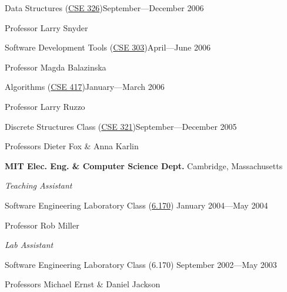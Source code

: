 \documentclass[letter]{article}
\begin{document}
\vspace{0.5\baselineskip}
\par
Data Structures (\href{http://www.cs.washington.edu/education/courses/326/06au/}{CSE 326})\hfill September---December 2006
\par
Professor Larry Snyder

\vspace{0.5\baselineskip}
\par
Software Development Tools (\href{http://www.cs.washington.edu/education/courses/303/06sp/}{CSE 303})\hfill April---June 2006
\par
Professor Magda Balazinska

\vspace{0.5\baselineskip}
\par
Algorithms (\href{http://www.cs.washington.edu/education/courses/417/06wi/}{CSE 417})\hfill January---March 2006
\par
Professor Larry Ruzzo

\vspace{0.5\baselineskip}
\par
Discrete Structures Class (\href{http://www.cs.washington.edu/education/courses/321/05au/}{CSE 321})\hfill September---December 2005
\par
Professors Dieter Fox \& Anna Karlin
\par

\vspace{\baselineskip}
\par
{\bf MIT Elec. Eng. \& Computer Science Dept.} \hfill Cambridge, Massachusetts

\vspace{0.5\baselineskip}
\par
{\em Teaching Assistant}
\par
Software Engineering Laboratory Class (\href{http://courses.csail.mit.edu/6.170/old-www/2004-Spring/admin-info/generalinfo.html#Staff}{6.170}) \hfill January 2004---May 2004
\par
Professor Rob Miller

\vspace{0.5\baselineskip}
\par
{\em Lab Assistant}
\par
Software Engineering Laboratory Class (6.170) \hfill September 2002---May 2003
\par
Professors Michael Ernst \& Daniel Jackson
\par

\vspace{\baselineskip}
\newpage
\end{document}
